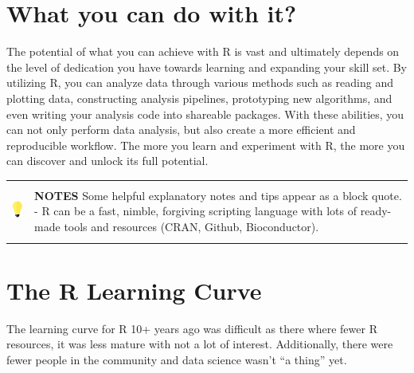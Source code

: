 \documentclass[
]{book}
\begin{document}
\hypertarget{what-you-can-do-with-it}{%
\section*{What you can do with it?}\label{what-you-can-do-with-it}}

The potential of what you can achieve with R is vast and ultimately depends on the level of dedication you have towards learning and expanding your skill set. By utilizing R, you can analyze data through various methods such as reading and plotting data, constructing analysis pipelines, prototyping new algorithms, and even writing your analysis code into shareable packages. With these abilities, you can not only perform data analysis, but also create a more efficient and reproducible workflow. The more you learn and experiment with R, the more you can discover and unlock its full potential.

\hfill\break

\begin{longtable}[]{@{}
  >{\raggedright\arraybackslash}p{}
  >{\raggedright\arraybackslash}p{}@{}}
\toprule\noalign{}
\endhead
\bottomrule\noalign{}
\endlastfoot
\includegraphics[width=\textwidth,height=0.70833in]{images/01.png} & \textbf{NOTES} Some helpful explanatory notes and tips appear as a block quote. \textbar{}
\textbar{}
- R can be a fast, nimble, forgiving scripting language with lots of ready-made tools and resources (CRAN, Github, Bioconductor). \\
\end{longtable}

\hfill\break

\hypertarget{the-r-learning-curve}{%
\section*{The R Learning Curve}\label{the-r-learning-curve}}

The learning curve for R 10+ years ago was difficult as there where fewer R resources, it was less mature with not a lot of interest. Additionally, there were fewer people in the community and data science wasn't ``a thing'' yet.
\end{document}

